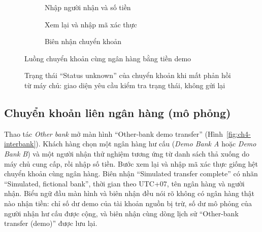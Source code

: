\begin{figure}[H]
\centering
\begin{subfigure}[t]{0.31\textwidth}
  \centering
  \caption{Nhập người nhận và số tiền}
  \label{fig:ch4-transfer-form}
\end{subfigure}\hfill
\begin{subfigure}[t]{0.31\textwidth}
  \centering
  \caption{Xem lại và nhập mã xác thực}
  \label{fig:ch4-transfer-review}
\end{subfigure}\hfill
\begin{subfigure}[t]{0.31\textwidth}
  \centering
  \caption{Biên nhận chuyển khoản}
  \label{fig:ch4-transfer-receipt}
\end{subfigure}
\caption{Luồng chuyển khoản cùng ngân hàng bằng tiền demo}
\label{fig:ch4-transfer}
\end{figure}

\begin{figure}[H]
\centering
{}
\caption{Trạng thái ``Status unknown'' của chuyển khoản khi mất phản hồi từ máy chủ: giao diện yêu cầu kiểm tra trạng thái, không gửi lại}
\label{fig:ch4-transfer-states}
\end{figure}

\subsection{Chuyển khoản liên ngân hàng (mô phỏng)}
\label{sec:ch4-interbank}

Thao tác \textit{Other bank} mở màn hình ``Other-bank demo transfer'' (Hình~\ref{fig:ch4-interbank}). Khách hàng chọn một ngân hàng hư cấu (\textit{Demo Bank A} hoặc \textit{Demo Bank B}) và một người nhận thử nghiệm tương ứng từ danh sách thả xuống do máy chủ cung cấp, rồi nhập số tiền. Bước xem lại và nhập mã xác thực giống hệt chuyển khoản cùng ngân hàng. Biên nhận ``Simulated transfer complete'' có nhãn ``Simulated, fictional bank'', thời gian theo UTC+07, tên ngân hàng và người nhận. Biểu ngữ đầu màn hình và biên nhận đều nói rõ không có ngân hàng thật nào nhận tiền: chỉ số dư demo của tài khoản nguồn bị trừ, số dư mô phỏng của người nhận hư cấu được cộng, và biên nhận cùng dòng lịch sử ``Other-bank transfer (demo)'' được lưu lại.

